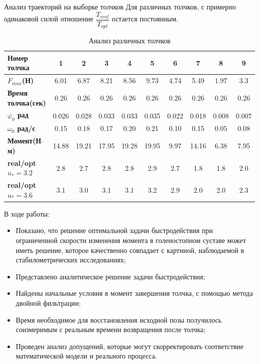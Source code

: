 \documentclass[10pt]{beamer}
\begin{document}
\begin{frame}[shrink=21]{Анализ траекторий на выборке толчков}
	Для различных толчков, с примерно одинаковой силой отношение $\dfrac{T_{real}}{T_{opt}}$ остается постоянным.
	\begin{table}[h!]
		\centering
		\begin{tabular}{|l|c|c|c|c|c|c|c|c|c|}
			\hline
			\textbf{Номер толчка}       & \textbf{1} & \textbf{2} & \textbf{3} & \textbf{4} & \textbf{5} & \textbf{6} & \textbf{7} & \textbf{8} & \textbf{9} \\ \hline
			\textbf{$F_{max}$(Н)}       & 6.01       & 6.87       & 8.21       & 8.56       & 9.73       & 4.74       & 5.49       & 1.97       & 3.3        \\ \hline
			\textbf{Время толчка(сек)}  & 0.26       & 0.26       & 0.26       & 0.26       & 0.26       & 0.26       & 0.26       & 0.26       & 0.26       \\ \hline
			\textbf{$\varphi_0$ рад}        & 0.026      & 0.028      & 0.033      & 0.033      & 0.035      & 0.022      & 0.018      & 0.008      & 0.007      \\ \hline
			\textbf{$\omega_0$ рад/с}         & 0.15     & 0.18     & 0.17     & 0.20     & 0.21     & 0.10     & 0.15     & 0.05     & 0.08     \\ \hline
			\textbf{Момент(Н$\cdot$м)}       & 14.88      & 19.21      & 17.95      & 19.28      & 19.95      & 9.97       & 14.16      & 6.38       & 7.95       \\ \hline
			\textbf{real/opt $u_*=3.2$} & 2.8        & 2.7        & 2.8        & 2.8        & 2.9        & 2.7        & 1.8        & 1.8        & 2.0        \\ \hline
			\textbf{real/opt $u_*=3.6$} & 3.1        & 3.0        & 3.1        & 3.1        & 3.2        & 2.9        & 2.0        & 2.0        & 2.3        \\ \hline
		\end{tabular}
		\caption{Анализ различных толчков}
		\label{final_table}
	\end{table}
\end{frame}
\begin{frame}
	В ходе работы:
\begin{itemize}
    \item Показано, что решение оптимальной задачи быстродействия при ограниченной
          скорости изменения момента в голеностопном суставе может иметь решение, которое качественно совпадает с картиной, наблюдаемой в стабилометрических исследованиях;
    \item Представлено аналитическое решение задачи быстродействия;
    \item Найдены начальные условия в момент завершения толчка, с помощью метода двойной фильтрации;
    \item Время необходимое для восстановления исходной позы получилось
          соизмеримым с реальным времени возвращения после толчка;
    \item Проведен анализ допущений, которые могут скорректировать соответствие математической модели и реального процесса.
\end{itemize}
\end{frame}
\begin{frame}
\end{frame}
\end{document}
